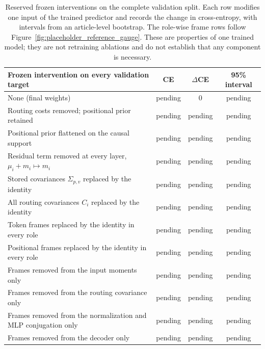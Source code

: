\documentclass[twoside,11pt]{article}
\begin{document}
\begin{table}[htbp]
\centering
\small
\begin{tabularx}{\textwidth}{@{}>{\raggedright\arraybackslash}Xccc@{}}
\toprule
Frozen intervention on every validation target & CE & $\Delta$CE & 95\% interval \\
\midrule
None (final weights) & pending & 0 & pending \\
Routing costs removed; positional prior retained & pending & pending & pending \\
Positional prior flattened on the causal support & pending & pending & pending \\
Residual term removed at every layer, $\mu_i+m_i\mapsto m_i$ & pending & pending & pending \\
Stored covariances $\Sigma_{p,v}$ replaced by the identity & pending & pending & pending \\
All routing covariances $C_i$ replaced by the identity & pending & pending & pending \\
Token frames replaced by the identity in every role & pending & pending & pending \\
Positional frames replaced by the identity in every role & pending & pending & pending \\
Frames removed from the input moments only & pending & pending & pending \\
Frames removed from the routing covariance only & pending & pending & pending \\
Frames removed from the normalization and MLP conjugation only & pending & pending & pending \\
Frames removed from the decoder only & pending & pending & pending \\
\bottomrule
\end{tabularx}
\caption{Reserved frozen interventions on the complete validation split. Each row modifies one input of the trained predictor and records the change in cross-entropy, with intervals from an article-level bootstrap. The role-wise frame rows follow Figure~\ref{fig:placeholder_reference_gauge}. These are properties of one trained model; they are not retraining ablations and do not establish that any component is necessary.}
\label{tab:placeholder_interventions}
\end{table}
\end{document}
